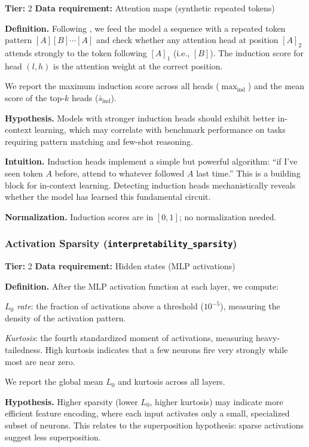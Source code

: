 \documentclass{article}
\begin{document}
\textbf{Tier:} 2 \quad \textbf{Data requirement:} Attention maps (synthetic repeated tokens)

\textbf{Definition.}
Following \citet{olsson2022context}, we feed the model a sequence with a repeated token pattern $[A] [B] \cdots [A]$ and check whether any attention head at position $[A]_2$ attends strongly to the token following $[A]_1$ (i.e., $[B]$). The induction score for head $(l, h)$ is the attention weight at the correct position.

We report the maximum induction score across all heads ($\max_{\text{ind}}$) and the mean score of the top-$k$ heads ($\bar{s}_{\text{ind}}$).

\textbf{Hypothesis.}
Models with stronger induction heads should exhibit better in-context learning, which may correlate with benchmark performance on tasks requiring pattern matching and few-shot reasoning.

\textbf{Intuition.}
Induction heads implement a simple but powerful algorithm: ``if I've seen token $A$ before, attend to whatever followed $A$ last time.'' This is a building block for in-context learning. Detecting induction heads mechanistically reveals whether the model has learned this fundamental circuit.

\textbf{Normalization.} Induction scores are in $[0, 1]$; no normalization needed.

\subsubsection{Activation Sparsity (\texttt{interpretability\_sparsity})}
\label{app:sparsity}

\textbf{Tier:} 2 \quad \textbf{Data requirement:} Hidden states (MLP activations)

\textbf{Definition.}
After the MLP activation function at each layer, we compute:

\emph{$L_0$ rate}: the fraction of activations above a threshold ($10^{-5}$), measuring the density of the activation pattern.

\emph{Kurtosis}: the fourth standardized moment of activations, measuring heavy-tailedness. High kurtosis indicates that a few neurons fire very strongly while most are near zero.

We report the global mean $L_0$ and kurtosis across all layers.

\textbf{Hypothesis.}
Higher sparsity (lower $L_0$, higher kurtosis) may indicate more efficient feature encoding, where each input activates only a small, specialized subset of neurons. This relates to the superposition hypothesis: sparse activations suggest less superposition.
\end{document}
